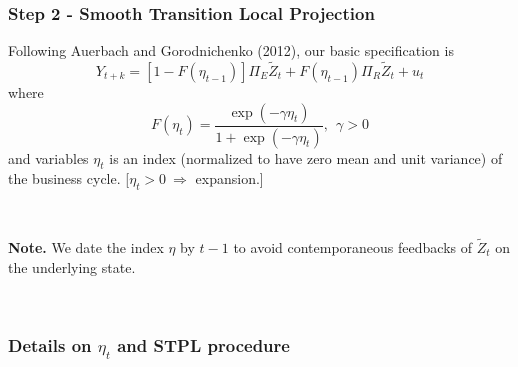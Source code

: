\documentclass[hyperref={pdfpagelabels=false}]{beamer}
\begin{document}
\begin{frame}[label=STLP]
\frametitle{Step 2 - Smooth Transition Local Projection}
	
	Following Auerbach and Gorodnichenko (2012), our basic specification is
	$$
	Y_{t+k} = [1 - F(\eta_{t-1})] \Pi_E \tilde{Z}_t + F(\eta_{t-1}) \Pi_R \tilde{Z}_t + u_t
	$$
	where
	$$
	F(\eta_t) = \frac{\exp(- \gamma \eta_t)}{1 + \exp(- \gamma \eta_t)}, \ \ \gamma > 0
	$$
and variables $\eta_t$ is an index (normalized to have zero mean and unit variance) of the business cycle. [$\eta_t>0 \ \Rightarrow$ expansion.]

\

\textbf{Note.} We date the index $\eta$ by $t-1$ to avoid contemporaneous feedbacks of $\tilde{Z}_t$ on the underlying state.

\

\hyperlink{Details}{}

\end{frame}










\begin{frame}[label=Details]
\frametitle{Details on $\eta_t$ and STPL procedure}






\hyperlink{STLP}{}

\end{frame}
\end{document}
